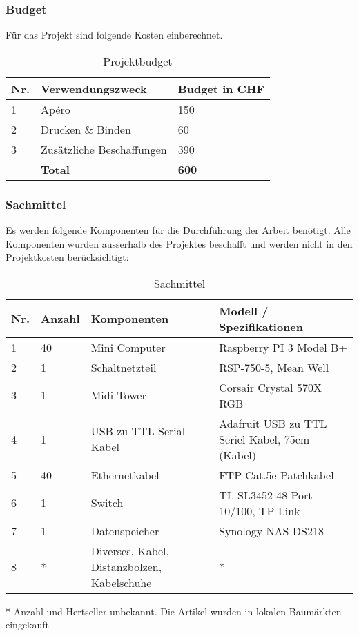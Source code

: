 \subsubsection{Budget}
Für das Projekt sind folgende Kosten einberechnet.
\begin{table}[H]
\centering
\begin{tabular}[t]{p{1cm}p{5cm}p{2cm}}
\hline
\rowcolor{heading}\textbf{Nr.} & \textbf{Verwendungszweck} & \textbf{Budget \newline in CHF} \\\hline
1 & Apéro & 150 \\\hline
2 & Drucken \& Binden & 60 \\\hline
3 & Zusätzliche Beschaffungen & 390 \\\hline
\textbf{} & \textbf{Total} & \textbf{600}  \\\hline
\end{tabular}
\caption{Projektbudget}
\end{table}

\subsubsection{Sachmittel}
Es werden folgende Komponenten für die Durchführung der Arbeit benötigt. Alle Komponenten wurden ausserhalb des Projektes beschafft und werden nicht in den Projektkosten berücksichtigt:


\begin{table}[H]
\centering
\begin{tabular}[t]{p{1cm}p{1.2cm}p{6.5cm}p{6.5cm}}
\hline
\rowcolor{heading}\textbf{Nr.} & \textbf{Anzahl} & \textbf{Komponenten} & Modell / Spezifikationen\\\hline
1 & 40 & Mini Computer & Raspberry PI 3 Model B+\\\hline
2 & 1 & Schaltnetzteil & RSP-750-5, Mean Well\\\hline
3 & 1 & Midi Tower & Corsair Crystal 570X RGB\\\hline
4 & 1 & USB zu TTL Serial-Kabel & Adafruit USB zu TTL Seriel Kabel, 75cm (Kabel) \\\hline
5 & 40 & Ethernetkabel & FTP Cat.5e Patchkabel \\\hline
6 & 1 & Switch & TL-SL3452 48-Port 10/100, TP-Link \\\hline
7 & 1 & Datenspeicher & Synology NAS DS218\\\hline
8 & * & Diverses, Kabel, Distanzbolzen, \newline Kabelschuhe & *\\\hline
\end{tabular}
\caption{Sachmittel}
\end{table}
* Anzahl und Hertseller unbekannt. Die Artikel wurden in lokalen Baumärkten eingekauft